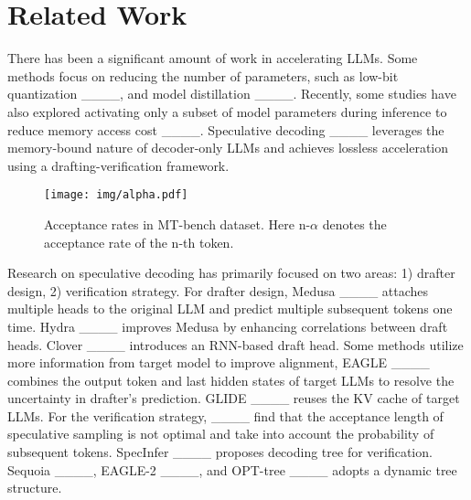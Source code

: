 \section{Related Work}
There has been a significant amount of work in accelerating LLMs. Some methods focus on reducing the number of parameters, such as low-bit quantization ____, and model distillation ____. Recently, some studies have also explored activating only a subset of model parameters during inference to reduce memory access cost ____. Speculative decoding ____ leverages the memory-bound nature of decoder-only LLMs and achieves lossless acceleration using a drafting-verification framework. 

\begin{figure}[t]
\centering
\setlength{\abovecaptionskip}{0.0cm}
\texttt{[image: img/alpha.pdf]}
\caption{Acceptance rates in MT-bench dataset. Here n-$\alpha$ denotes the acceptance rate of the n-th token.}
\label{fig:coral}
\end{figure}

Research on speculative decoding has primarily focused on two areas: 1) drafter design, 2) verification strategy. For drafter design, Medusa ____ attaches multiple heads to the original LLM and predict multiple subsequent tokens one time. Hydra ____ improves Medusa by enhancing correlations between draft heads. Clover ____ introduces an RNN-based draft head. Some methods utilize more information from target model to improve alignment, EAGLE ____ combines the output token and last hidden states of target LLMs to resolve the uncertainty in drafter's prediction. GLIDE ____ reuses the KV cache of target LLMs. For the verification strategy,  ____ find that the acceptance length of speculative sampling is not optimal and take into account the probability of subsequent tokens. SpecInfer ____ proposes decoding tree for verification. Sequoia ____, EAGLE-2 ____, and OPT-tree ____ adopts a dynamic tree structure.